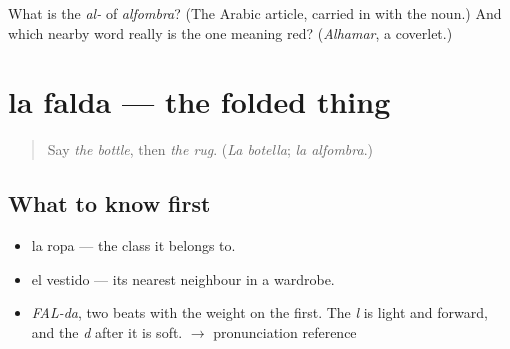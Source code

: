 \begin{tcolorbox}[breakable,colback=teal!4,colframe=teal!35!black,title={Before you move on}]
What is the \emph{al-} of \emph{alfombra}? (The Arabic article, carried in with the noun.) And which nearby word really is the one meaning red? (\emph{Alhamar}, a coverlet.)
\end{tcolorbox}
\section[la falda]{la falda — the folded thing}

\label{lesson:ES-C373-falda}



\begin{quote}
Say \emph{the bottle}, then \emph{the rug}. (\emph{La botella}; \emph{la alfombra}.)
\end{quote}

\subsection*{What to know first}
\begin{itemize}
\raggedright
  \item la ropa — the class it belongs to.
  \item el vestido — its nearest neighbour in a wardrobe.
\end{itemize}

\begin{sounds}
\begin{itemize}
\raggedright
  \item \emph{FAL-da}, two beats with the weight on the first. The \emph{l} is light and forward, and the \emph{d} after it is soft. $\to$ pronunciation reference
\end{itemize}
\end{sounds}

